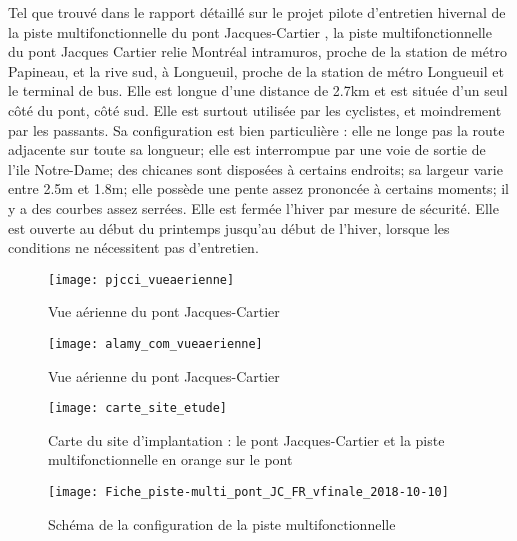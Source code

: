 ﻿\par Tel que trouvé dans le rapport détaillé sur le projet pilote d'entretien hivernal de la piste multifonctionnelle du pont Jacques-Cartier \cite{pjcci_rapport_2018}, la piste multifonctionnelle du pont Jacques Cartier relie Montréal intramuros, proche de la station de métro Papineau, et la rive sud, à Longueuil, proche de la station de métro Longueuil et le terminal de bus. Elle est longue d'une distance de 2.7km et est située d'un seul côté du pont, côté sud. Elle est surtout utilisée par les cyclistes, et moindrement par les passants. 
Sa configuration est bien particulière \cite{pjcci_fiche_2018}: elle ne longe pas la route adjacente sur toute sa longueur; elle est interrompue par une voie de sortie de l'ile Notre-Dame; des chicanes sont disposées à certains endroits; sa largeur varie entre 2.5m et 1.8m; elle possède une pente assez prononcée à certains moments; il y a des courbes assez serrées.
Elle est fermée l'hiver par mesure de sécurité. Elle est ouverte au début du printemps jusqu'au début de l'hiver, lorsque les conditions ne nécessitent pas d'entretien.
\label{pjcci_vueaerienne}
\begin{figure}[H]
    \centering
    \texttt{[image: pjcci\_vueaerienne]}
    \caption{Vue aérienne du pont Jacques-Cartier}
    \label{fig:pjcci_vueaerienne}
\end{figure}
\label{alamy_com_vueaerienne}
\begin{figure}[H]
    \centering
    \texttt{[image: alamy\_com\_vueaerienne]}
    \caption{Vue aérienne du pont Jacques-Cartier}
    \label{fig:alamy_com_vueaerienne}
\end{figure}
\label{carte_site_etude}
\begin{figure}[H]
    \centering
    \texttt{[image: carte\_site\_etude]}
    \caption{Carte du site d'implantation : le pont Jacques-Cartier et la piste multifonctionnelle en orange sur le pont}
    \label{fig:carte_site_etude}
\end{figure}
\label{Fiche_piste-multi_pont_JC_FR_vfinale_2018-10-10}
\begin{figure}[H]
    \centering
    \texttt{[image: Fiche\_piste-multi\_pont\_JC\_FR\_vfinale\_2018-10-10]}
    \caption{Schéma de la configuration de la piste multifonctionnelle}
    \label{fig:Fiche_piste-multi_pont_JC_FR_vfinale_2018-10-10}
\end{figure}